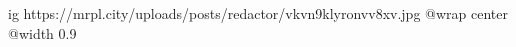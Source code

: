  
 
 
 
 

\ifcmt
  ig https://mrpl.city/uploads/posts/redactor/vkvn9klyronvv8xv.jpg
  @wrap center
  @width 0.9
\fi
